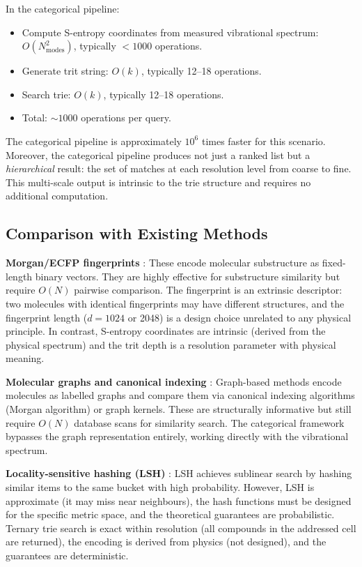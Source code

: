 \documentclass[11pt,twocolumn,a4paper]{article}
\theoremstyle{definition}
\theoremstyle{remark}
\begin{document}
In the categorical pipeline:

\begin{itemize}[nosep]
\item Compute S-entropy coordinates from measured vibrational spectrum: $O(N_{\mathrm{modes}}^2)$, typically $< 1000$ operations.
\item Generate trit string: $O(k)$, typically 12--18 operations.
\item Search trie: $O(k)$, typically 12--18 operations.
\item Total: $\sim 1000$ operations per query.
\end{itemize}

The categorical pipeline is approximately $10^6$ times faster for this scenario. Moreover, the categorical pipeline produces not just a ranked list but a \emph{hierarchical} result: the set of matches at each resolution level from coarse to fine. This multi-scale output is intrinsic to the trie structure and requires no additional computation.

\subsection{Comparison with Existing Methods}

\textbf{Morgan/ECFP fingerprints} \citep{rogers2010}: These encode molecular substructure as fixed-length binary vectors. They are highly effective for substructure similarity but require $O(N)$ pairwise comparison. The fingerprint is an extrinsic descriptor: two molecules with identical fingerprints may have different structures, and the fingerprint length ($d = 1024$ or 2048) is a design choice unrelated to any physical principle. In contrast, S-entropy coordinates are intrinsic (derived from the physical spectrum) and the trit depth is a resolution parameter with physical meaning.

\textbf{Molecular graphs and canonical indexing} \citep{morgan1965}: Graph-based methods encode molecules as labelled graphs and compare them via canonical indexing algorithms (Morgan algorithm) or graph kernels. These are structurally informative but still require $O(N)$ database scans for similarity search. The categorical framework bypasses the graph representation entirely, working directly with the vibrational spectrum.

\textbf{Locality-sensitive hashing (LSH)} \citep{indyk1998}: LSH achieves sublinear search by hashing similar items to the same bucket with high probability. However, LSH is approximate (it may miss near neighbours), the hash functions must be designed for the specific metric space, and the theoretical guarantees are probabilistic. Ternary trie search is exact within resolution (all compounds in the addressed cell are returned), the encoding is derived from physics (not designed), and the guarantees are deterministic.
\end{document}

